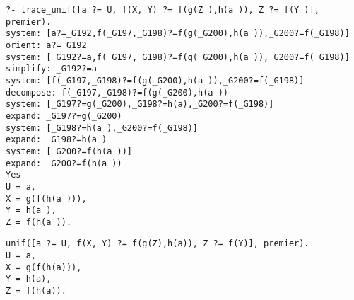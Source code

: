 \documentclass[10pt,a4paper]{report}
\begin{document}
\begin{lstlisting}[caption ={Exemple d'execution avec un niveau de debug}]
?- trace_unif([a ?= U, f(X, Y) ?= f(g(Z ),h(a )), Z ?= f(Y )], premier).
system: [a?=_G192,f(_G197,_G198)?=f(g(_G200),h(a )),_G200?=f(_G198)]
orient: a?=_G192
system: [_G192?=a,f(_G197,_G198)?=f(g(_G200),h(a )),_G200?=f(_G198)]
simplify: _G192?=a
system: [f(_G197,_G198)?=f(g(_G200),h(a )),_G200?=f(_G198)]
decompose: f(_G197,_G198)?=f(g(_G200),h(a ))
system: [_G197?=g(_G200),_G198?=h(a),_G200?=f(_G198)]
expand: _G197?=g(_G200)
system: [_G198?=h(a ),_G200?=f(_G198)]
expand: _G198?=h(a )
system: [_G200?=f(h(a ))]
expand: _G200?=f(h(a ))
Yes
U = a,
X = g(f(h(a ))),
Y = h(a ),
Z = f(h(a )).
\end{lstlisting}

\begin{lstlisting}[caption ={Exemple d'execution }]
unif([a ?= U, f(X, Y) ?= f(g(Z),h(a)), Z ?= f(Y)], premier).
U = a,
X = g(f(h(a))),
Y = h(a),
Z = f(h(a)).
\end{lstlisting}
\end{document}
